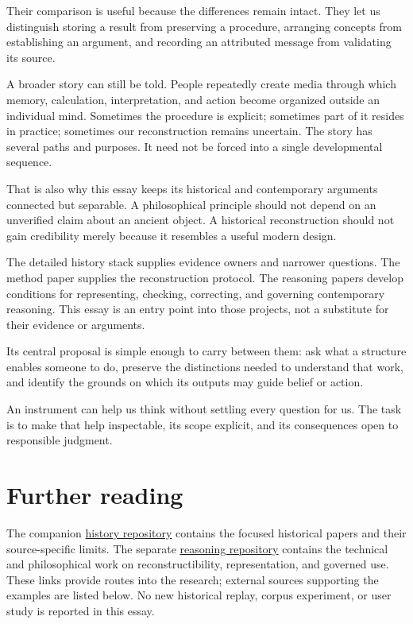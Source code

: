 \documentclass[11pt]{article}
\begin{document}
Their comparison is useful because the differences remain intact.
They let us distinguish storing a result from preserving a procedure,
arranging concepts from establishing an argument, and recording an attributed
message from validating its source.

A broader story can still be told. People repeatedly create media through
which memory, calculation, interpretation, and action become organized
outside an individual mind. Sometimes the procedure is explicit; sometimes
part of it resides in practice; sometimes our reconstruction remains uncertain.
The story has several paths and purposes. It need not be forced into a
single developmental sequence.

That is also why this essay keeps its historical and contemporary arguments
connected but separable. A philosophical principle should not depend on
an unverified claim about an ancient object. A historical reconstruction
should not gain credibility merely because it resembles a useful modern
design.

The detailed history stack supplies evidence owners and narrower questions.
The method paper supplies the reconstruction protocol. The reasoning papers
develop conditions for representing, checking, correcting, and governing
contemporary reasoning. This essay is an entry point into those projects,
not a substitute for their evidence or arguments.

Its central proposal is simple enough to carry between them:
ask what a structure enables someone to do, preserve the distinctions
needed to understand that work, and identify the grounds on which its
outputs may guide belief or action.

An instrument can help us think without settling every question for us.
The task is to make that help inspectable, its scope explicit, and its
consequences open to responsible judgment.

\section*{Further reading}
The companion \href{https://github.com/yippibrian/history}{history repository}
contains the focused historical papers and their source-specific limits.
The separate \href{https://github.com/yippibrian/reconstructibility-under-projection}{reasoning repository}
contains the technical and philosophical work on reconstructibility,
representation, and governed use. These links provide routes into the
research; external sources supporting the examples are listed below.
No new historical replay, corpus experiment, or user study is reported
in this essay.
\end{document}
